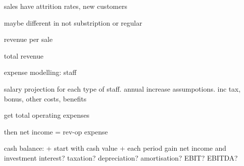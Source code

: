 sales have attrition rates, new customers

maybe different in not substription or regular

revenue per sale

total revenue

expense modelling: staff

salary projection for each type of staff. annual increase assumpotions. inc tax, bonus, other costs, benefits

get total operating expenses

then net income = rev-op expense

cash balance:
+ start with cash value
+ each period gain net income and investment
interest?
taxation?
depreciation?
amortisation?
EBIT?
EBITDA?


